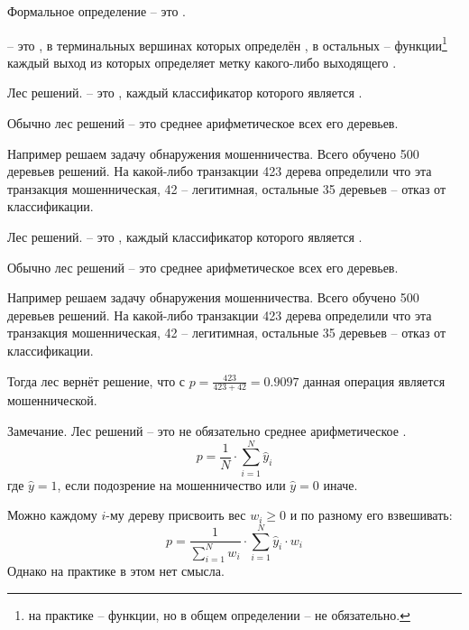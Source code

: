 \begin{frame}{Формальное определение}
	 -- это   .
	
	 -- это , в терминальных вершинах которых 
	определён , в остальных  -- функции\footnote{
	на практике --  функции, но в общем определении -- не обязательно.}
	каждый выход из которых определяет метку какого-либо выходящего .
\end{frame}

\begin{frame}{Лес решений.}
	 -- это , каждый классификатор которого 
	является .
	
	Обычно лес решений -- это среднее арифметическое всех его деревьев. 
	
	Например решаем задачу обнаружения мошенничества. Всего обучено 500 деревьев решений.
	На какой-либо транзакции 423 дерева определили что эта транзакция мошенническая,
	42 -- легитимная, остальные 35 деревьев -- отказ от классификации.
	
\end{frame}

\begin{frame}{Лес решений.}
	 -- это , каждый классификатор которого 
	является .
	
	Обычно лес решений -- это среднее арифметическое всех его деревьев. 
	
	Например решаем задачу обнаружения мошенничества. Всего обучено 500 деревьев решений.
	На какой-либо транзакции 423 дерева определили что эта транзакция мошенническая,
	42 -- легитимная, остальные 35 деревьев -- отказ от классификации.
	
	Тогда лес вернёт решение, что 
	с 
	$p=\frac{423}{423+42} = 0.9097$ 
	данная операция является мошеннической.
\end{frame}

\begin{frame}
	\begin{block}{Замечание.}
	\small
	Лес решений -- это не обязательно среднее арифметическое .
	\begin{equation*}
	p = \frac{1}{N} \cdot \sum_{i=1}^{N} \hat y_i
	\end{equation*}
	где $\hat y = 1$, если подозрение на мошенничество или $\hat y =0$ иначе.
	
	Можно каждому $i$-му дереву  присвоить вес $w_i \geqslant 0$ и по разному его взвешивать:
	\begin{equation*}
	p = \frac{1}{ \sum_{i=1}^{N} w_i}  \cdot \sum_{i=1}^{N} \hat y_i \cdot w_i
	\end{equation*}
	Однако на практике в этом нет смысла.
	\end{block}
\end{frame}

